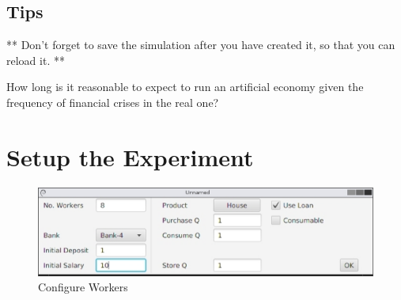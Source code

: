\documentclass{article}
\begin{document}
\subsection*{Tips}
** Don't forget to save the simulation after you have created it, so that
you can reload it. **

How long is it reasonable to expect to run an artificial economy given the
frequency of financial crises in the real one?



 

\section{Setup the Experiment}    
\begin{figure}[h]
\begin{center}
\includegraphics[width=12cm]{builderconfig.eps}
\caption{Configure Workers}
\end{center}
\end{figure}
\end{document}
